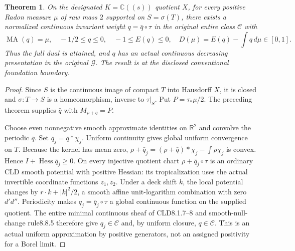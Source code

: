 \documentclass[11pt]{article}
\newtheorem{theorem}{Theorem}
\newcommand{\DD}{d'd''}
\newcommand{\MA}{\operatorname{MA}}
\newcommand{\C}{\mathcal C}
\begin{document}
\begin{theorem}\label{newrad:analytic}
On the designated $K=\mathbb C((s))$ quotient $X$, for every positive
Radon measure $\mu$ of raw mass $2$ supported on
$S=\sigma(T)$, there exists a normalized continuous invariant weight
$q=\bar q\circ\tau$ in the \emph{original entire} class $\C$ with
\[
 \MA(q)=\mu,\quad -1/2\le q\le0,\quad -1\le E(q)\le0,
 \quad D(\mu)=E(q)-\int q\,d\mu\in[0,1].
\]
Thus the full dual is attained, and $q$ has an actual continuous
decreasing presentation in the original $\mathcal G$.
The result is at the disclosed conventional foundation boundary.
\end{theorem}
\begin{proof}
Since $S$ is the continuous image of compact $T$ into Hausdorff $X$,
it is closed and $\sigma:T\to S$ is a homeomorphism, inverse to
$\tau|_S$. Put $P=\tau_*\mu/2$. The preceding theorem supplies
$\bar q$ with $M_{\rho+\bar q}=P$.

Choose even nonnegative smooth approximate identities on $\mathbb R^2$
and convolve the periodic $\bar q$. Set $\bar q_j=\bar q*\chi_j$.
Uniform continuity gives global uniform convergence on $T$.
Because the kernel has mean zero,
$\rho+\bar q_j=(\rho+\bar q)*\chi_j-\int\rho\chi_j$ is convex.
Hence $I+\operatorname{Hess}\bar q_j\ge0$.
On every injective quotient chart $\rho+\bar q_j\circ\tau$ is an
ordinary CLD smooth potential with positive Hessian: its tropicalization
uses the actual invertible coordinate functions $z_1,z_2$. Under a
deck shift $k$, the local potential changes by $r\cdot k+|k|^2/2$,
a smooth affine unit-logarithm combination with zero $\DD$.
Periodicity makes $q_j=\bar q_j\circ\tau$ a global continuous
function on the supplied quotient. The entire minimal continuous
sheaf of CLD8.1.7--8 and smooth-null-change rule8.8.5 therefore give
$q_j\in\C$ and, by uniform closure, $q\in\C$. This is an actual
uniform approximation by positive generators, not an assigned positivity
for a Borel limit.


\end{proof}
\end{document}

